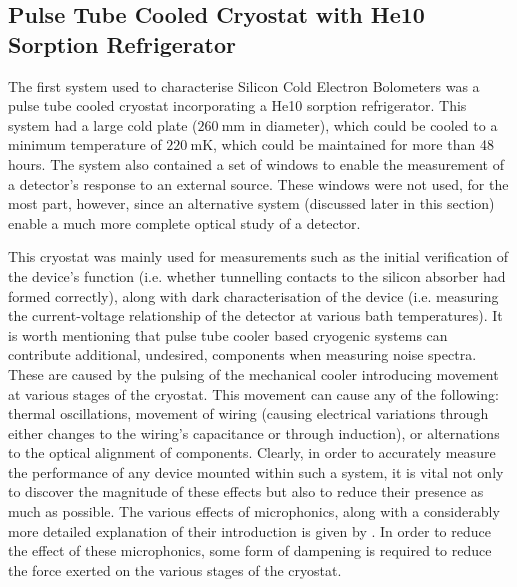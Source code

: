 \subsection{Pulse Tube Cooled Cryostat with He10 Sorption Refrigerator}
\label{ssec:Aloysius}
The first system used to characterise Silicon Cold Electron Bolometers was a pulse tube cooled cryostat incorporating a He10 sorption refrigerator. This system had a large cold plate ($260~\mathrm{mm}$ in diameter), which could be cooled to a minimum temperature of $220~\mathrm{mK}$, which could be maintained for more than 48 hours. The system also contained a set of windows to enable the measurement of a detector's response to an external source. These windows were not used, for the most part, however, since an alternative system (discussed later in this section) enable a much more complete optical study of a detector.
\par 
This cryostat was mainly used for measurements such as the initial verification of the device's function (i.e. whether tunnelling contacts to the silicon absorber had formed correctly), along with dark characterisation of the device (i.e. measuring the current-voltage relationship of the detector at various bath temperatures). It is worth mentioning that pulse tube cooler based cryogenic systems can contribute  additional, undesired, components when measuring noise spectra. These are caused by the pulsing of the mechanical cooler introducing movement at various stages of the cryostat. This movement can cause any of the following: thermal oscillations, movement of wiring (causing electrical variations through either changes to the wiring's capacitance or through induction), or alternations to the optical alignment of components. Clearly, in order to accurately measure the performance of any device mounted within such a system, it is vital not only to discover the magnitude of these effects but also to reduce their presence as much as possible. The various effects of microphonics, along with a considerably more detailed explanation of their introduction is given by \textcite{Bhatia1999}. In order to reduce the effect of these microphonics, some form of dampening is required to reduce the force exerted on the various stages of the cryostat.
